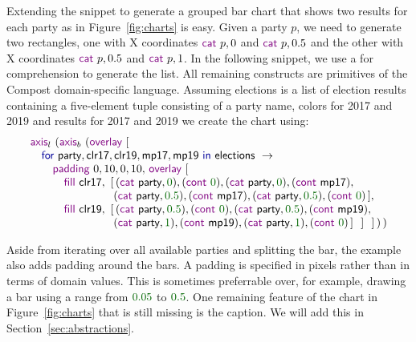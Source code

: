 \documentclass{jfp}
\newcommand{\num}[1]{\textcolor{numclr}{#1}}
\newcommand{\ident}[1]{\textnormal{\textcolor{idclr}{\sffamily #1}}}
\newcommand{\kvd}[1]{\textnormal{\textcolor{kvdclr}{\sffamily #1}}}
\newcommand{\fkvd}[1]{\textnormal{\textcolor{fkvdclr}{\sffamily #1}}}
\begin{document}
Extending the snippet to generate a grouped bar chart that shows two results
for each party as in Figure~\ref{fig:charts} is easy. Given a party $p$, we need to
generate two rectangles, one with X coordinates $\kvd{cat}~p, 0$ and $\kvd{cat}~p, 0.5$
and the other with X coordinates $\kvd{cat}~p, 0.5$ and $\kvd{cat}~p, 1$.
In the following snippet, we use a \fkvd{for} comprehension to generate the list. All remaining
constructs are primitives of the Compost domain-specific language. Assuming \ident{elections} is a
list of election results containing a five-element tuple consisting of a party name, colors for
2017 and 2019 and results for 2017 and 2019 we create the chart using:
%
\begin{equation*}
\begin{array}{l}
  \kvd{axis}_l~(\kvd{axis}_b~(\kvd{overlay}~[\\
  \quad \fkvd{for}~\ident{party}, \ident{clr17}, \ident{clr19}, \ident{mp17}, \ident{mp19}~\fkvd{in}~\ident{elections}~\rightarrow\\
  \quad\quad \kvd{padding}~0,10,0,10,\,\kvd{overlay}~[\\
  \quad\quad\quad \kvd{fill}~\ident{clr17},~[\,(\kvd{cat}~\ident{party}, \num{0}), (\kvd{cont}~\num{0}), (\kvd{cat}~\ident{party}, \num{0}), (\kvd{cont}~\ident{mp17}),\\
  \quad\quad\quad \hspace{4.08em}           ~(\kvd{cat}~\ident{party}, \num{0.5}), (\kvd{cont}~\ident{mp17}), (\kvd{cat}~\ident{party}, \num{0.5}), (\kvd{cont}~\num{0}) \,], \\
  \quad\quad\quad \kvd{fill}~\ident{clr19},~[\,(\kvd{cat}~\ident{party}, \num{0.5}), (\kvd{cont}~\num{0}), (\kvd{cat}~\ident{party}, \num{0.5}), (\kvd{cont}~\ident{mp19}),\\
  \quad\quad\quad \hspace{4.08em}           ~(\kvd{cat}~\ident{party}, \num{1}), (\kvd{cont}~\ident{mp19}), (\kvd{cat}~\ident{party}, \num{1}), (\kvd{cont}~\num{0})\,]~~]~~]\,)\,)\\
\end{array}
\end{equation*}

\noindent
Aside from iterating over all available parties and splitting the bar, the example also adds padding
around the bars. A padding is specified in pixels rather than in terms of domain values. This is
sometimes preferrable over, for example, drawing a bar using a range from $\num{0.05}$ to $\num{0.5}$.
One remaining feature of the chart in Figure~\ref{fig:charts} that is still missing is the caption.
We will add this in Section~\ref{sec:abstractions}.
\end{document}
